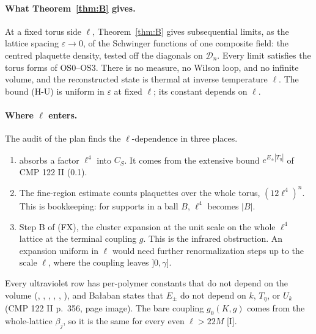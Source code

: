 \paragraph{What Theorem~\ref{thm:B} gives.} At a fixed torus side $\ell$, Theorem~\ref{thm:B} gives subsequential limits, as the lattice spacing $\varepsilon\to0$, of the Schwinger functions of one composite field: the centred plaquette density, tested off the diagonals on $\mathcal D_n$. Every limit satisfies the torus forms of OS0--OS3. There is no measure, no Wilson loop, and no infinite volume, and the reconstructed state is thermal at inverse temperature $\ell$. The bound (H-U) is uniform in $\varepsilon$ at fixed $\ell$; its constant depends on $\ell$.

\paragraph{Where $\ell$ enters.} The audit of the plan finds the $\ell$-dependence in three places.
\begin{enumerate}
\item {} absorbs a factor $\ell^4$ into $C_S$. It comes from the extensive bound $e^{E_\pm|T_\eta|}$ of CMP 122 II (0.1).
\item The fine-region estimate counts plaquettes over the whole torus, $(12\ell^4)^n$. This is bookkeeping: for supports in a ball $B$, $\ell^4$ becomes $|B|$.
\item Step B of (FX), the cluster expansion at the unit scale on the whole $\ell^4$ lattice at the terminal coupling $g$. This is the infrared obstruction. An expansion uniform in $\ell$ would need further renormalization steps up to the scale $\ell$, where the coupling leaves $]0,\gamma]$.
\end{enumerate}
Every ultraviolet row has per-polymer constants that do not depend on the volume (, , , , , ), and Ba{\l}aban states that $E_\pm$ do not depend on $k$, $T_\eta$, or $U_k$ (CMP 122 II p.~356, page image). The bare coupling $g_0(K,g)$ comes from the whole-lattice $\beta_j$, so it is the same for every even $\ell>22M$ [I].

